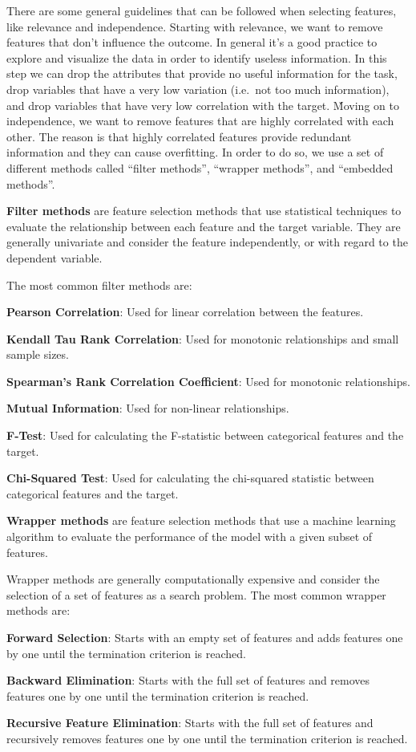 There are some general guidelines that can be followed when selecting features, like relevance and independence.
Starting with relevance, we want to remove features that don't influence the outcome. In general it's a good practice
to explore and visualize the data in order to identify useless information. In this step we can drop the attributes
that provide no useful information for the task, drop variables that have a very low variation (i.e.\ not too much
information), and drop variables that have very low correlation with the target. \v

Moving on to independence, we want to remove features that are highly correlated with each other. The reason is that
highly correlated features provide redundant information and they can cause overfitting. In order to do so, we use
a set of different methods called ``filter methods'', ``wrapper methods'', and ``embedded methods''.

\textbf{Filter methods} are feature selection methods that use statistical techniques to evaluate the relationship
between each feature and the target variable. They are generally univariate and consider the feature independently,
or with regard to the dependent variable.
\ed

The most common filter methods are:
\bit
\item \textbf{Pearson Correlation}: Used for linear correlation between the features.
\item \textbf{Kendall Tau Rank Correlation}: Used for monotonic relationships and small sample sizes.
\item \textbf{Spearman's Rank Correlation Coefficient}: Used for monotonic relationships.
\item \textbf{Mutual Information}: Used for non-linear relationships.
\item \textbf{F-Test}: Used for calculating the F-statistic between categorical features and the target.
\item \textbf{Chi-Squared Test}: Used for calculating the chi-squared statistic between categorical features and the
target.
\eit

\textbf{Wrapper methods} are feature selection methods that use a machine learning algorithm to evaluate the
performance of the model with a given subset of features.
\ed

Wrapper methods are generally computationally expensive and consider the selection of a set of features as a search
problem. The most common wrapper methods are:
\bit
\item \textbf{Forward Selection}: Starts with an empty set of features and adds features one by one until the
termination criterion is reached.
\item \textbf{Backward Elimination}: Starts with the full set of features and removes features one by one until the
termination criterion is reached.
\item \textbf{Recursive Feature Elimination}: Starts with the full set of features and recursively removes features
one by one until the termination criterion is reached.
\eit

